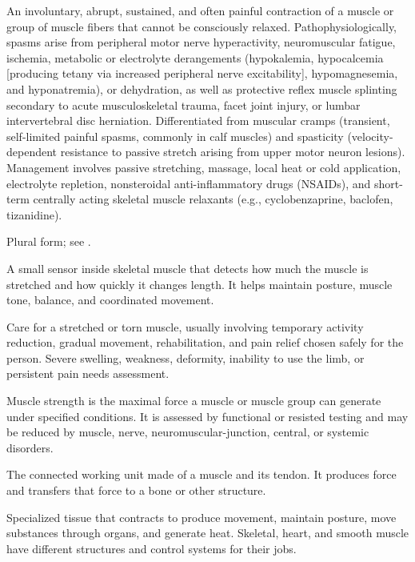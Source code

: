  An involuntary, abrupt, sustained, and often painful contraction of a muscle or group of muscle fibers that cannot be consciously relaxed. Pathophysiologically, spasms arise from peripheral motor nerve hyperactivity, neuromuscular fatigue, ischemia, metabolic or electrolyte derangements (hypokalemia, hypocalcemia [producing tetany via increased peripheral nerve excitability], hypomagnesemia, and hyponatremia), or dehydration, as well as protective reflex muscle splinting secondary to acute musculoskeletal trauma, facet joint injury, or lumbar intervertebral disc herniation. Differentiated from muscular cramps (transient, self-limited painful spasms, commonly in calf muscles) and spasticity (velocity-dependent resistance to passive stretch arising from upper motor neuron lesions). Management involves passive stretching, massage, local heat or cold application, electrolyte repletion, nonsteroidal anti-inflammatory drugs (NSAIDs), and short-term centrally acting skeletal muscle relaxants (e.g., cyclobenzaprine, baclofen, tizanidine).

 Plural form; see .

 A small sensor inside skeletal muscle that detects how much the muscle is stretched and how quickly it changes length. It helps maintain posture, muscle tone, balance, and coordinated movement.

 Care for a stretched or torn muscle, usually involving temporary activity reduction, gradual movement, rehabilitation, and pain relief chosen safely for the person. Severe swelling, weakness, deformity, inability to use the limb, or persistent pain needs assessment.

 Muscle strength is the maximal force a muscle or muscle group can generate under specified conditions. It is assessed by functional or resisted testing and may be reduced by muscle, nerve, neuromuscular-junction, central, or systemic disorders.

 The connected working unit made of a muscle and its tendon. It produces force and transfers that force to a bone or other structure.

 Specialized tissue that contracts to produce movement, maintain posture, move substances through organs, and generate heat. Skeletal, heart, and smooth muscle have different structures and control systems for their jobs.

